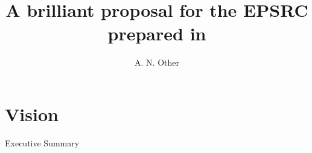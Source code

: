 \documentclass{epsrc}
\begin{document}
\title{A brilliant proposal for the EPSRC prepared in \LaTeXe}
\author{A. N. Other}
\maketitle

\section{Vision}

Executive Summary




\end{document}
